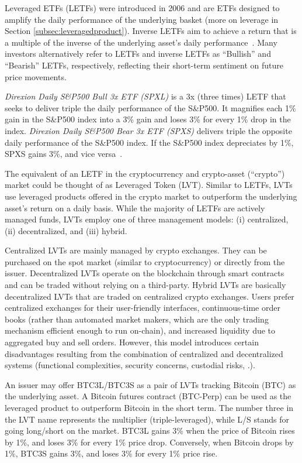 Leveraged ETFs (LETFs) were introduced in 2006 and are ETFs designed to amplify the daily performance of the underlying basket (more on leverage in Section \ref{subsec:leveragedproduct}). Inverse LETFs aim to achieve a return that is a multiple of the inverse of the underlying asset’s daily performance~\cite{hill2009understanding,cheng2009dynamics,SEC}. Many investors alternatively refer to LETFs and inverse LETFs as ``Bullish'' and ``Bearish'' LETFs, respectively, reflecting their short-term sentiment on future price movements.
\begin{example}
	\textsl{Direxion Daily S\&P500 Bull 3x ETF (SPXL)} is a 3x (three times) LETF that seeks to deliver triple the daily performance of the S\&P500. It magnifies each 1\% gain in the S\&P500 index into a 3\% gain and loses 3\% for every 1\% drop in the index. \textsl{Direxion Daily S\&P500 Bear 3x ETF (SPXS)} delivers triple the opposite daily performance of the S\&P500 index. If the S\&P500 index depreciates by 1\%, SPXS gains 3\%, and vice versa~\cite{wided2019properties,lettau2018exchange}.
\end{example}

The equivalent of an LETF in the cryptocurrency and crypto-asset (``crypto'') market could be thought of as Leveraged Token (LVT). Similar to LETFs, LVTs use leveraged products offered in the crypto market to outperform the underlying asset’s return on a daily basis. While the majority of LETFs are actively managed funds, LVTs employ one of three management models: (i) centralized, (ii) decentralized, and (iii) hybrid. 

Centralized LVTs are mainly managed by crypto exchanges. They can be purchased on the spot market (similar to cryptocurrency) or directly from the issuer. Decentralized LVTs operate on the blockchain through smart contracts and can be traded without relying on a third-party. Hybrid LVTs are basically decentralized LVTs that are traded on centralized crypto exchanges. Users prefer centralized exchanges for their user-friendly interfaces, continuous-time order books (rather than automated market makers, which are the only trading mechanism efficient enough to run on-chain), and increased liquidity due to aggregated buy and sell orders. However, this model introduces certain disadvantages resulting from the combination of centralized and decentralized systems (\eg functional complexities, security concerns, custodial risks, \etc.).

\begin{example}
	An issuer may offer BTC3L/BTC3S as a pair of LVTs tracking Bitcoin (BTC) as the underlying asset. A Bitcoin futures contract (BTC-Perp) can be used as the leveraged product to outperform Bitcoin in the short term. The number three in the LVT name represents the multiplier (triple-leveraged), while L/S stands for going long/short on the market. BTC3L gains 3\% when the price of Bitcoin rises by 1\%, and loses 3\% for every 1\% price drop. Conversely, when Bitcoin drops by 1\%, BTC3S gains 3\%, and loses 3\% for every 1\% price rise.
\end{example}

